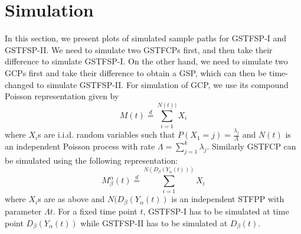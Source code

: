 \documentclass[11pt,oneside,reqno]{amsart}
\theoremstyle{definition}
\theoremstyle{remarkstyle}
\begin{document}
\section{Simulation}\label{sec 12}
In this section, we present plots of simulated sample paths for GSTFSP-I and GSTFSP-II. We need to simulate two GSTFCPs first, and then take their difference to simulate GSTFSP-I. On the other hand, we need to simulate two GCPs first and take their difference to obtain a GSP, which can then be time-changed to simulate GSTFSP-II. For simulation of GCP, we use its compound Poisson representation given by
\begin{equation*}
M(t)\overset{d}{=}\sum_{i=1}^{N(t))}X_i 
\end{equation*}
where $X_i$s are i.i.d. random variables such that $P(X_1=j)=\frac{\lambda_j}{\Lambda}$ and $N(t)$ is an independent Poisson process with rate $\Lambda=\sum_{j=1}^{k}\lambda_j$. Similarly GSTFCP can be simulated using the following representation:
\begin{equation*}
M^{\alpha}_{\beta}(t)\overset{d}{=}\sum_{i=1}^{N(D_{\beta}(Y_{\alpha}(t)))}X_i 
\end{equation*}
where $X_i$s are as above and $N(D_{\beta}(Y_{\alpha}(t))$ is an independent STFPP with parameter $\Lambda t$. For a fixed time point $t$, GSTFSP-I has to be simulated at time point $D_\beta(Y_{\alpha}(t))$ while GSTFSP-II has to be simulated at $D_\beta(t)$. \\




\end{document}
